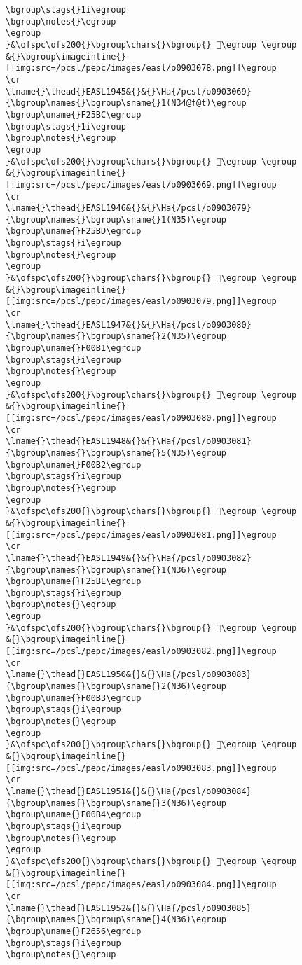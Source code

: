 \begin{verbatim}
\bgroup\stags{}1i\egroup
\bgroup\notes{}\egroup
\egroup
}&\ofspc\ofs200{}\bgroup\chars{}\bgroup{} 󰂰\egroup \egroup
&{}\bgroup\imageinline{}[[img:src=/pcsl/pepc/images/easl/o0903078.png]]\egroup
\cr
\lname{}\thead{}EASL1945&{}&{}\Ha{/pcsl/o0903069}{\bgroup\names{}\bgroup\sname{}1(N34@f@t)\egroup
\bgroup\uname{}F25BC\egroup
\bgroup\stags{}1i\egroup
\bgroup\notes{}\egroup
\egroup
}&\ofspc\ofs200{}\bgroup\chars{}\bgroup{} 󲖼\egroup \egroup
&{}\bgroup\imageinline{}[[img:src=/pcsl/pepc/images/easl/o0903069.png]]\egroup
\cr
\lname{}\thead{}EASL1946&{}&{}\Ha{/pcsl/o0903079}{\bgroup\names{}\bgroup\sname{}1(N35)\egroup
\bgroup\uname{}F25BD\egroup
\bgroup\stags{}i\egroup
\bgroup\notes{}\egroup
\egroup
}&\ofspc\ofs200{}\bgroup\chars{}\bgroup{} 󲖽\egroup \egroup
&{}\bgroup\imageinline{}[[img:src=/pcsl/pepc/images/easl/o0903079.png]]\egroup
\cr
\lname{}\thead{}EASL1947&{}&{}\Ha{/pcsl/o0903080}{\bgroup\names{}\bgroup\sname{}2(N35)\egroup
\bgroup\uname{}F00B1\egroup
\bgroup\stags{}i\egroup
\bgroup\notes{}\egroup
\egroup
}&\ofspc\ofs200{}\bgroup\chars{}\bgroup{} 󰂱\egroup \egroup
&{}\bgroup\imageinline{}[[img:src=/pcsl/pepc/images/easl/o0903080.png]]\egroup
\cr
\lname{}\thead{}EASL1948&{}&{}\Ha{/pcsl/o0903081}{\bgroup\names{}\bgroup\sname{}5(N35)\egroup
\bgroup\uname{}F00B2\egroup
\bgroup\stags{}i\egroup
\bgroup\notes{}\egroup
\egroup
}&\ofspc\ofs200{}\bgroup\chars{}\bgroup{} 󰂲\egroup \egroup
&{}\bgroup\imageinline{}[[img:src=/pcsl/pepc/images/easl/o0903081.png]]\egroup
\cr
\lname{}\thead{}EASL1949&{}&{}\Ha{/pcsl/o0903082}{\bgroup\names{}\bgroup\sname{}1(N36)\egroup
\bgroup\uname{}F25BE\egroup
\bgroup\stags{}i\egroup
\bgroup\notes{}\egroup
\egroup
}&\ofspc\ofs200{}\bgroup\chars{}\bgroup{} 󲖾\egroup \egroup
&{}\bgroup\imageinline{}[[img:src=/pcsl/pepc/images/easl/o0903082.png]]\egroup
\cr
\lname{}\thead{}EASL1950&{}&{}\Ha{/pcsl/o0903083}{\bgroup\names{}\bgroup\sname{}2(N36)\egroup
\bgroup\uname{}F00B3\egroup
\bgroup\stags{}i\egroup
\bgroup\notes{}\egroup
\egroup
}&\ofspc\ofs200{}\bgroup\chars{}\bgroup{} 󰂳\egroup \egroup
&{}\bgroup\imageinline{}[[img:src=/pcsl/pepc/images/easl/o0903083.png]]\egroup
\cr
\lname{}\thead{}EASL1951&{}&{}\Ha{/pcsl/o0903084}{\bgroup\names{}\bgroup\sname{}3(N36)\egroup
\bgroup\uname{}F00B4\egroup
\bgroup\stags{}i\egroup
\bgroup\notes{}\egroup
\egroup
}&\ofspc\ofs200{}\bgroup\chars{}\bgroup{} 󰂴\egroup \egroup
&{}\bgroup\imageinline{}[[img:src=/pcsl/pepc/images/easl/o0903084.png]]\egroup
\cr
\lname{}\thead{}EASL1952&{}&{}\Ha{/pcsl/o0903085}{\bgroup\names{}\bgroup\sname{}4(N36)\egroup
\bgroup\uname{}F2656\egroup
\bgroup\stags{}i\egroup
\bgroup\notes{}\egroup

\end{verbatim}
